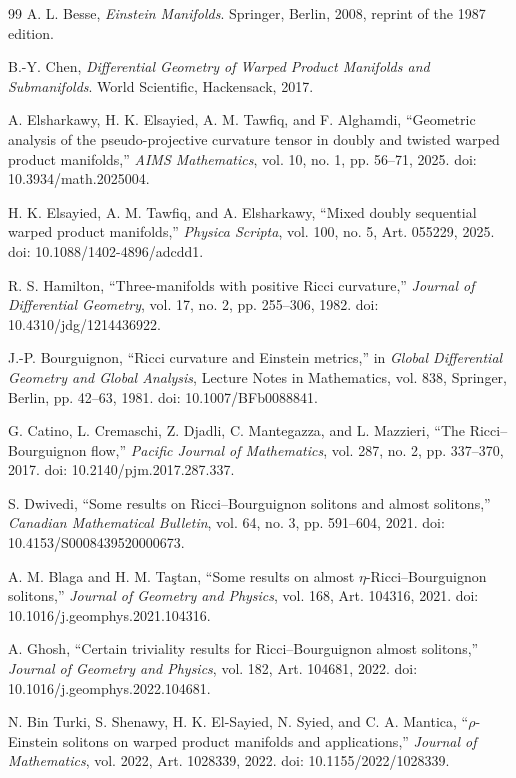 \documentclass[a4paper,11pt]{article}
\theoremstyle{plain}
\numberwithin{equation}{section}
\begin{document}
\begin{thebibliography}{99}
	A. L. Besse,
	\emph{Einstein Manifolds}.
	Springer, Berlin, 2008,
	reprint of the 1987 edition.
	
	B.-Y. Chen,
	\emph{Differential Geometry of Warped Product Manifolds and
		Submanifolds}.
	World Scientific, Hackensack, 2017.
	
	A. Elsharkawy, H. K. Elsayied, A. M. Tawfiq, and F. Alghamdi,
	``Geometric analysis of the pseudo-projective curvature tensor in
	doubly and twisted warped product manifolds,''
	\emph{AIMS Mathematics},
	vol. 10, no. 1, pp. 56--71, 2025.
	doi: 10.3934/math.2025004.
	
	H. K. Elsayied, A. M. Tawfiq, and A. Elsharkawy,
	``Mixed doubly sequential warped product manifolds,''
	\emph{Physica Scripta},
	vol. 100, no. 5, Art. 055229, 2025.
	doi: 10.1088/1402-4896/adcdd1.
	
	R. S. Hamilton,
	``Three-manifolds with positive Ricci curvature,''
	\emph{Journal of Differential Geometry},
	vol. 17, no. 2, pp. 255--306, 1982.
	doi: 10.4310/jdg/1214436922.
	
	J.-P. Bourguignon,
	``Ricci curvature and Einstein metrics,''
	in \emph{Global Differential Geometry and Global Analysis},
	Lecture Notes in Mathematics, vol. 838,
	Springer, Berlin, pp. 42--63, 1981.
	doi: 10.1007/BFb0088841.
	
	G. Catino, L. Cremaschi, Z. Djadli, C. Mantegazza, and L. Mazzieri,
	``The Ricci--Bourguignon flow,''
	\emph{Pacific Journal of Mathematics},
	vol. 287, no. 2, pp. 337--370, 2017.
	doi: 10.2140/pjm.2017.287.337.
	
	S. Dwivedi,
	``Some results on Ricci--Bourguignon solitons and almost solitons,''
	\emph{Canadian Mathematical Bulletin},
	vol. 64, no. 3, pp. 591--604, 2021.
	doi: 10.4153/S0008439520000673.
	
	A. M. Blaga and H. M. Ta\c{s}tan,
	``Some results on almost $\eta$-Ricci--Bourguignon solitons,''
	\emph{Journal of Geometry and Physics},
	vol. 168, Art. 104316, 2021.
	doi: 10.1016/j.geomphys.2021.104316.
	
	A. Ghosh,
	``Certain triviality results for Ricci--Bourguignon almost solitons,''
	\emph{Journal of Geometry and Physics},
	vol. 182, Art. 104681, 2022.
	doi: 10.1016/j.geomphys.2022.104681.
	
	N. Bin Turki, S. Shenawy, H. K. El-Sayied, N. Syied,
	and C. A. Mantica,
	``$\rho$-Einstein solitons on warped product manifolds and
	applications,''
	\emph{Journal of Mathematics},
	vol. 2022, Art. 1028339, 2022.
	doi: 10.1155/2022/1028339.
	

\end{thebibliography}
\end{document}
